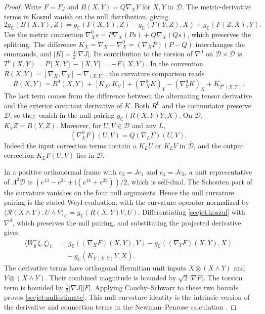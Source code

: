 \documentclass[11pt]{article}
\numberwithin{equation}{section}
\theoremstyle{definition}
\theoremstyle{remark}
\begin{document}
\begin{proof}
 Write \(F=F_J\) and \(B(X,Y)=Q\nabla_XY\) for \(X,Y\) in
 \(\mathcal D\). The metric-derivative terms in Koszul vanish on the
 null distribution, giving
 \begin{equation}
  \label{secjet:koszul}
  2g_{\mathbb C}(B(X,Y),Z)=g_{\mathbb C}(F(X,Y),Z)
    -g_{\mathbb C}(F(Y,Z),X)+g_{\mathbb C}(F(Z,X),Y).
 \end{equation}
 Use the metric connection
 \(\nabla^0_X s=P\nabla_X(Ps)+Q\nabla_X(Qs)\), which preserves the
 splitting. The difference
 \(K_X=\nabla_X-\nabla^0_X=(\nabla_XP)(P-Q)\) interchanges the
 summands, and \(|K|=\tfrac12|\nabla J|\). Its contribution to
 the torsion of \(\nabla^0\) on \(\mathcal D\times\mathcal D\) is
 \(T^0(X,Y)=P[X,Y]-[X,Y]=-F(X,Y)\). In the convention
 \(R(X,Y)=[\nabla_X,\nabla_Y]-\nabla_{[X,Y]}\), the curvature
 comparison reads
 \[
 R(X,Y)=R^0(X,Y)+[K_X,K_Y]
        +(\nabla_X^0K)_Y-(\nabla_Y^0K)_X+K_{T^0(X,Y)} .
 \]
 The last term comes from the difference between the alternating
 tensor derivative and the exterior covariant derivative of \(K\).
 Both \(R^0\) and the commutator preserve \(\mathcal D\), so they
 vanish in the null pairing \(g_{\mathbb C}(R(X,Y)Y,X)\).
 On \(\mathcal D\), \(K_YZ=B(Y,Z)\). Moreover, for \(U,V\in
 \mathcal D\) and any \(L\),
 \[
    (\nabla^0_LF)(U,V)=Q(\nabla_LF)(U,V).
 \]
 Indeed the input correction terms contain a \(K_LU\) or \(K_LV\)
 in \(\overline{\mathcal D}\), and the output correction
 \(K_L F(U,V)\) lies in \(\mathcal D\).

 In a positive orthonormal frame with \(e_2=Je_1\) and \(e_4=Je_3\),
 a unit representative of \(\Lambda^2\mathcal D\) is
 \((e^{13}-e^{24}+\mathrm i(e^{14}+e^{23}))/2\), which is self-dual.
 The Schouten part of the curvature vanishes on the four null
 arguments. Hence the null curvature pairing is the stated Weyl
 evaluation, with the curvature operator normalized by
 \(\langle\mathcal R(X\wedge Y),U\wedge V\rangle_{\mathbb C}
 =g_{\mathbb C}(R(X,Y)V,U)\). Differentiating
 \eqref{secjet:koszul} with \(\nabla^0\), which preserves the null
 pairing, and substituting the projected derivative gives
 \begin{align*}
 \langle W_g^+\xi,\xi\rangle_{\mathbb C}
  &=g_{\mathbb C}((\nabla_XF)(X,Y),Y)
    -g_{\mathbb C}((\nabla_YF)(X,Y),X)\\
  &\quad-g_{\mathbb C}(K_{F(X,Y)}Y,X).
 \end{align*}
 The derivative terms have orthogonal Hermitian unit inputs
 \(X\otimes(X\wedge Y)\) and \(Y\otimes(X\wedge Y)\). Their
 combined magnitude is bounded by \(\sqrt2|\nabla F|\). The torsion
 term is bounded by \(\tfrac12|\nabla J||F|\). Applying
 Cauchy--Schwarz to these two bounds proves \eqref{secjet:nullestimate}.
 This null curvature identity is the intrinsic version of the
 derivative and connection terms in the Newman--Penrose calculation
 \cite[eq.~(13) and Appendix eq.~(74)]{GoverHillNurowski2011GoldbergSachs}.
\end{proof}
\end{document}
